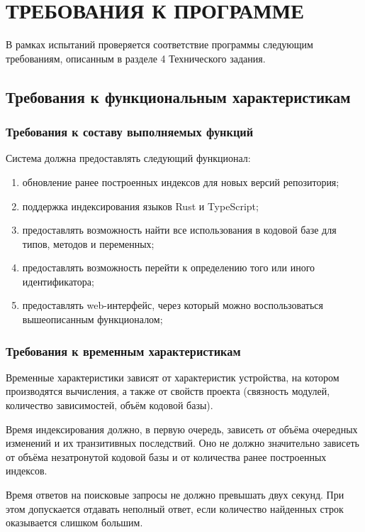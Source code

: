 \section{\uppercase{Требования к программе}}

В рамках испытаний проверяется соответствие программы следующим требованиям,
описанным в разделе 4 Технического задания.

\subsection{Требования к функциональным характеристикам}
\label{requirements.features}
    \subsubsection{Требования к составу выполняемых функций}
        Система должна предоставлять следующий функционал:
        \begin{enumerate}[series=requirements]
        	\item обновление ранее построенных индексов для новых версий репозитория;
        	\item поддержка индексирования языков Rust и TypeScript;
        	\item предоставлять возможность найти все использования в кодовой базе для типов, методов и переменных;
        	\item предоставлять возможность перейти к определению того или иного идентификатора;
        	\item предоставлять web-интерфейс, через который можно воспользоваться вышеописанным функционалом;
        \end{enumerate}

    \subsubsection{Требования к временным характеристикам}
        Временные характеристики зависят от характеристик устройства, на котором производятся вычисления, а также от свойств проекта (связность модулей, количество зависимостей, объём кодовой базы).
        
        Время индексирования должно, в первую очередь, зависеть от объёма очередных изменений и их транзитивных последствий. Оно не должно значительно зависеть от объёма незатронутой кодовой базы и от количества ранее построенных индексов.

        Время ответов на поисковые запросы не должно превышать двух секунд. При этом допускается отдавать неполный ответ, если количество найденных строк оказывается слишком большим.

